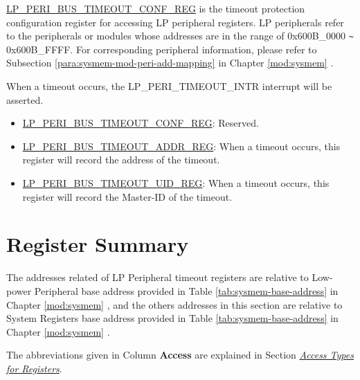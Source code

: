 \documentclass[main\_\_EN.tex]{subfiles}
\begin{document}
\hyperref[regdesc:LPPERIBUSTIMEOUTCONFREG]{LP\_PERI\_BUS\_TIMEOUT\_CONF\_REG} is the timeout protection configuration register for accessing LP peripheral registers.
LP peripherals refer to the peripherals or modules whose addresses are in the range of 0x600B\_0000 \verb+~+ 0x600B\_FFFF. For corresponding peripheral information, please refer to Subsection \ref{para:sysmem-mod-peri-add-mapping} \textit{} in Chapter \ref{mod:sysmem} \textit{}.

When a timeout occurs, the LP\_PERI\_TIMEOUT\_INTR interrupt will be asserted.

\begin{itemize}
    \item \hyperref[regdesc:LPPERIBUSTIMEOUTCONFREG]{LP\_PERI\_BUS\_TIMEOUT\_CONF\_REG}: Reserved.
    \item \hyperref[regdesc:LPPERIBUSTIMEOUTADDRREG]{LP\_PERI\_BUS\_TIMEOUT\_ADDR\_REG}: 
    When a timeout occurs, this register will record the address of the timeout.
    \item \hyperref[regdesc:LPPERIBUSTIMEOUTUIDREG]{LP\_PERI\_BUS\_TIMEOUT\_UID\_REG}: 
    When a timeout occurs, this register will record the Master-ID of the timeout.
\end{itemize}







\clearpage
\begin{landscape}
\hypertarget{sysreg-reg-summ}{}
\section{Register Summary}
\label{sec:sysreg-reg-summ}

The addresses related of LP Peripheral timeout registers are relative to Low-power Peripheral base address provided in Table \ref{tab:sysmem-base-address} in Chapter \ref{mod:sysmem} \textit{}, and the others addresses in this section are relative to System Registers base address provided in Table \ref{tab:sysmem-base-address} in Chapter \ref{mod:sysmem} \textit{}.

The abbreviations given in Column \textbf{Access} are explained in Section \hyperref[glossary-access-types]{\textit{Access Types for Registers}}.


\end{landscape}
\end{document}
